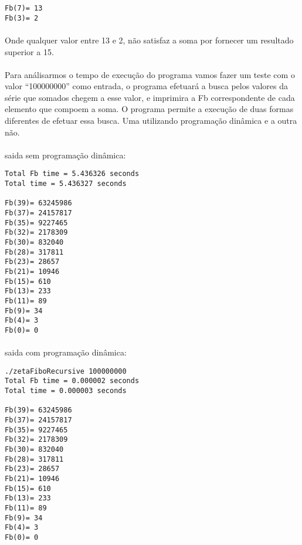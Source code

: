 \documentclass[10pt,a4paper]{article}
\begin{document}
{{{		\begin{Verbatim}[frame=single,
				framesep=3mm,
				xrightmargin=8cm]
Fb(7)= 13 
Fb(3)= 2 
\end{Verbatim}
	
	\paragraph{}Onde qualquer valor entre 13 e 2, não satisfaz a soma por fornecer
	um resultado superior a 15.

	\paragraph{}Para análisarmos o tempo de execução do programa vamos fazer um teste com 
	o valor ``100000000'' como entrada, o programa efetuará a busca pelos valores da série
	que somados chegem a esse valor, e imprimira a Fb correspondente de cada elemento 
	que compoem a soma. O programa permite a execução de duas formas diferentes de efetuar
	essa busca. Uma utilizando programação dinâmica e a outra não.

\newpage
	\paragraph{}saida sem programação dinâmica:
	\begin{Verbatim}[frame=single,
				framesep=3mm,
				xrightmargin=3cm]
Total Fb time = 5.436326 seconds
Total time = 5.436327 seconds

Fb(39)= 63245986 
Fb(37)= 24157817 
Fb(35)= 9227465 
Fb(32)= 2178309 
Fb(30)= 832040 
Fb(28)= 317811 
Fb(23)= 28657 
Fb(21)= 10946 
Fb(15)= 610 
Fb(13)= 233 
Fb(11)= 89 
Fb(9)= 34 
Fb(4)= 3 
Fb(0)= 0
\end{Verbatim}

}

	\paragraph{}saida com programação dinâmica:
	\begin{Verbatim}[frame=single,
				framesep=3mm,
				xrightmargin=3cm]
./zetaFiboRecursive 100000000
Total Fb time = 0.000002 seconds
Total time = 0.000003 seconds

Fb(39)= 63245986 
Fb(37)= 24157817 
Fb(35)= 9227465 
Fb(32)= 2178309 
Fb(30)= 832040 
Fb(28)= 317811 
Fb(23)= 28657 
Fb(21)= 10946 
Fb(15)= 610 
Fb(13)= 233 
Fb(11)= 89 
Fb(9)= 34 
Fb(4)= 3 
Fb(0)= 0 
\end{Verbatim}

}}
\end{document}

